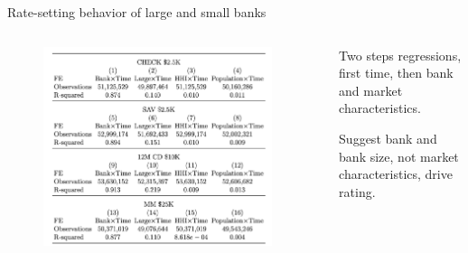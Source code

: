 \documentclass[notes,10pt, aspectratio=169]{beamer}
\newenvironment{wideitemize}{\itemize\addtolength{\itemsep}{10pt}}{\enditemize}
\begin{document}
\begin{frame}{Rate-setting behavior of large and small banks}

    \begin{columns}[T]
        
        \begin{column}{0.5\textwidth}
        
            \begin{figure}
                \centering
                \includegraphics[width=0.95\textwidth]{imgs/tab2.png}
            \end{figure}

    \end{column}
    \begin{column}{0.5\textwidth}
        
        \begin{wideitemize}
            \item Two steps regressions, first time, then bank and market characteristics.
            \item Suggest bank and bank size, not market characteristics, drive rating.
        \end{wideitemize}
    \end{column}
    \end{columns}
    
\end{frame}
\end{document}

